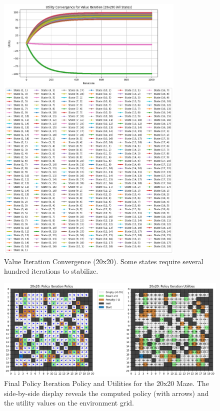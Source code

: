 \documentclass[11pt]{article}
\begin{document}
\begin{figure}[H]
    \centering
    \includegraphics[width=0.8\textwidth]{20x20_value_iteration_convergence.png}
    \caption{Value Iteration Convergence (20x20). Some states require several hundred iterations to stabilize.}
    \label{fig:20x20_vi_conv}
\end{figure}

\begin{figure}[H]
    \centering
    \includegraphics[width=\textwidth]{20x20_policy_iteration.png}
    \caption{Final Policy Iteration Policy and Utilities for the 20x20 Maze. The side-by-side display reveals the computed policy (with arrows) and the utility values on the environment grid.}
    \label{fig:20x20_pi_side_by_side}
\end{figure}
\end{document}
